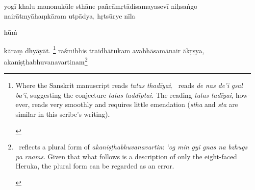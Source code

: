 \documentclass[naipra.tex]{subfiles}
\begin{document}
\begin{sanskrit}

\medskip\pstart
yogī khalu  manonukūle sthāne pañcāmṛtādisamayasevī  niḥsaṅgo   nairātmyāhaṃkāram utpādya, hṛtsūrye nīla\dsh \begin{mantra}hūṁ\end{mantra}\dsh kāraṃ dhyāyāt. 
\footnote{
	\begin{english}%
		Where the Sanskrit manuscript reads \emph{tatas thadīyai}, \TIB\ reads \emph{de nas de'i gsal ba'i}, suggesting the conjecture \emph{tatas taddīptai}.
		The reading \emph{tatas tadīyai}, however, reads very smoothly and requires little emendation (\emph{stha} and \emph{sta} are similar in this scribe's writing).
	\end{english}
} raśmibhis traidhātukam avabhāsamānair ākṛṣya, akaniṣṭhabhuvanavartinam\footnote{
	\begin{english}%
		\TIB\ reflects a plural form of \emph{akaniṣṭhabhuvanavartin}: \emph{'og min gyi gnas na bzhugs pa rnams}.
		Given that what follows is a description of only the eight-faced Heruka, the plural form can be regarded as an error.


\end{english}}
\end{sanskrit}
\end{document}
